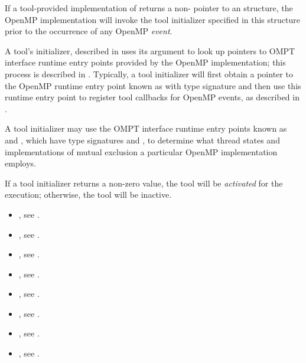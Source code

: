 If a tool-provided implementation of  returns a
non- pointer to an  structure,
the OpenMP implementation will invoke the tool initializer specified
in this structure prior to the occurrence of any OpenMP \emph{event}.

A tool's initializer, described in 
uses its argument  to look up pointers
to OMPT interface runtime entry points provided by the OpenMP
implementation; this process is described in .
Typically, a tool initializer will first
obtain a pointer to the OpenMP runtime entry point known as
 with type signature
 and then use this runtime entry point to
register tool callbacks for OpenMP events, as described in
.

A tool initializer may use the OMPT interface runtime
entry points known as  and
, which have type signatures
 and
, to determine what thread
states and implementations of mutual exclusion a particular OpenMP
implementation employs.


If a tool initializer returns a non-zero value, the tool will be
\emph{activated} for the execution; otherwise, the tool will be
inactive.

\crossreferences
\begin{itemize}
\item {}, see
  .
\item {}, see .
\item {}, see .
\item {}, see .
\item {}, see .
\item {}, see   .
\item {}, see .
\item {}, see .
\end{itemize}


